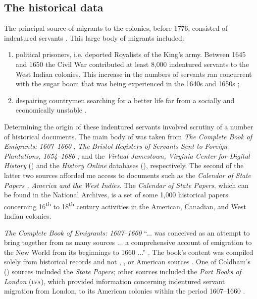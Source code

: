 \subsection{The historical data} \label{3.2.3}
The principal source of  migrants to the  colonies, before 1776, consisted of indentured servants \citep{Esposito82}. This large body of migrants included:

\begin{enumerate}
\item{political prisoners, i.e. deported Royalists of the King's army. Between 1645 and 1650 the  Civil War contributed at least 8,000 indentured servants to the West Indian colonies. This increase in the numbers of servants ran concurrent with the sugar boom that was being experienced in the 1640s and 1650s \citep{Brewer96};}
\item{despairing  countrymen searching for a better life far from a socially and economically unstable .}
\end{enumerate}

Determining the origin of these indentured servants involved scrutiny of a number of historical documents. The main body of  was taken from \emph{The Complete Book of Emigrants: 1607--1660} \citep{Coldham92, Coldham87}, \emph{The Bristol Registers of Servants Sent to Foreign Plantations, 1654--1686} \citep{Coldham88}, and the \emph{Virtual Jamestown, Virginia Center for Digital History} (\citeauthor{vcdh}) and the \emph{ History Online} databases (\citeauthor{bho09}), respectively. The second of the latter two sources afforded me access to documents such as the \emph{Calendar of State Papers , America and the West Indies}. The \emph{Calendar of State Papers}, which can be found in the  National Archives, is a set of some 1,000 historical papers concerning 16\textsuperscript{th} to 18\textsuperscript{th} century  activities in the American, Canadian, and West Indian colonies.

\emph{The Complete Book of Emigrants: 1607--1660} ``... was conceived as an attempt to bring together from as many  sources ... a comprehensive account of emigration to the New World from its beginnings to 1660 ...'' \citep[vii]{Coldham87}. The book's content was compiled solely from  historical records and not , ,  or American sources \citep{Coldham92, Coldham87}. One of  Coldham's (\citeyear{Coldham92, Coldham87}) sources included the \emph{ State Papers}; other sources included the \emph{Port Books of London} (\textsc{lva}), which provided information concerning indentured servant migration from London, to its American colonies within the period 1607--1660 \citep{Coldham92, Coldham87}.

